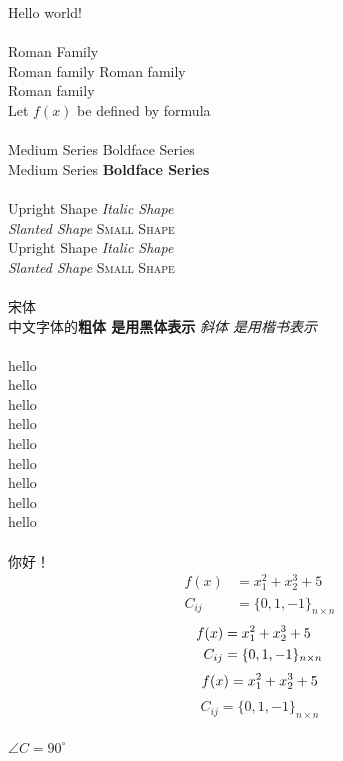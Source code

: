 \documentclass[12pt]{ctexbook}%
\newcommand{\degree}{^\circ}
\begin{document}
	Hello world!\\ \\
	\textrm{Roman Family}\\
	Roman family
	{\rmfamily Roman family}\\
	Roman family\\
	Let $f(x)$ be defined by formula\\ \\
	\textmd{Medium Series}		\textmd{Boldface Series}\\
	{\mdseries Medium Series}	{\bfseries Boldface Series}\\ \\
	\textup{Upright Shape}  \textit{Italic Shape}\\
	\textsl{Slanted Shape}  \textsc{Small Shape}\\
	{\upshape Upright Shape} {\itshape Italic Shape}\\
	{\slshape Slanted Shape} {\scshape Small Shape}\\ \\
	{\songti 宋体}   \\
	中文字体的\textbf{粗体 是用黑体表示} \textit{斜体 是用楷书表示}\\ \\
	{\tiny		 	hello}\\
	{\scriptsize 	hello}\\
	{\footnotesize  hello}\\
	{\small			hello}\\
	{\normalsize	hello}\\
	{\large			hello}\\
	{\LARGE			hello}\\
	{\huge			hello}\\
	{\Huge			hello}\\ \\
	{ 你好！}
	\begin{eqnarray}
	f(x)&=x_1^2+x_2^3+5\\
	C_{ij}&=\{0,1,-1\}_{n\times n}
	\end{eqnarray}
	\begin{eqnarray}\setcounter{equation}{7}
	f(x)&=x_1^2+x_2^3+5\\
	C_{ij}&=\{0,1,-1\}_{n\times n}
	\end{eqnarray}
	\begin{equation}\setcounter{equation}{7}
		f(x)=x_1^2+x_2^3+5\\
	\end{equation}
	\begin{equation}
	C_{ij}=\{0,1,-1\}_{n\times n}
	\end{equation}\\
	$\angle C=90\degree$
\end{document}
